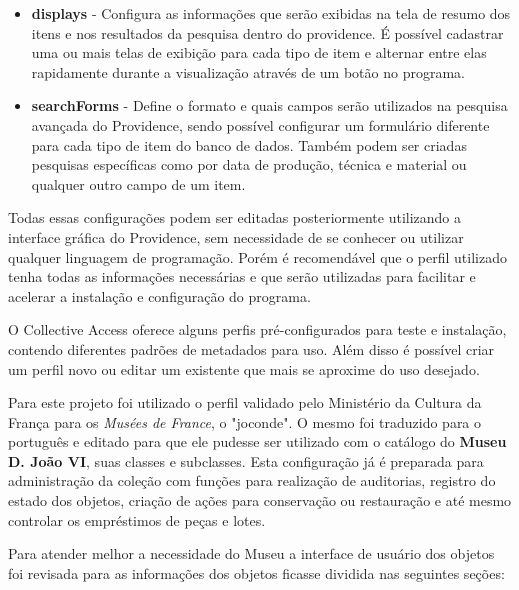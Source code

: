\documentclass[a4paper,12pt,oneside,onecolumn,final,fleqn]{repUERJ}
\begin{document}
\begin{itemize}
	\item \textbf{displays} - Configura as informações que serão exibidas na tela de resumo dos itens e nos resultados da pesquisa dentro do providence. É possível cadastrar uma ou mais telas de exibição para cada tipo de item e alternar entre elas rapidamente durante a visualização através de um botão no programa.
	\item \textbf{searchForms} - Define o formato e quais campos serão utilizados na pesquisa avançada do Providence, sendo possível configurar um formulário diferente para cada tipo de item do banco de dados. Também podem ser criadas pesquisas específicas como por data de produção, técnica e material ou qualquer outro campo de um item.
\end{itemize}


Todas essas configurações podem ser editadas posteriormente utilizando a interface gráfica do Providence, sem necessidade de se conhecer ou utilizar qualquer linguagem de programação. Porém é recomendável que o perfil utilizado tenha todas as informações necessárias e que serão utilizadas para facilitar e acelerar a instalação e configuração do programa.

O Collective Access oferece alguns perfis pré-configurados para teste e instalação, contendo diferentes padrões de metadados para uso. Além disso é possível criar um perfil novo ou editar um existente que mais se aproxime do uso desejado.

Para este projeto foi utilizado o perfil validado pelo Ministério da Cultura da França para os \textit{Musées de France}, o "joconde". O mesmo foi traduzido para o português e editado para que ele pudesse ser utilizado com o catálogo do \textbf{Museu D. João VI}, suas classes e subclasses. Esta configuração já é preparada para administração da coleção com funções para realização de auditorias, registro do estado dos objetos, criação de ações para conservação ou restauração e até mesmo controlar os empréstimos de peças e lotes.

Para atender melhor a necessidade do Museu a interface de usuário dos objetos foi revisada para as informações dos objetos ficasse dividida nas seguintes seções: 
\end{document}
